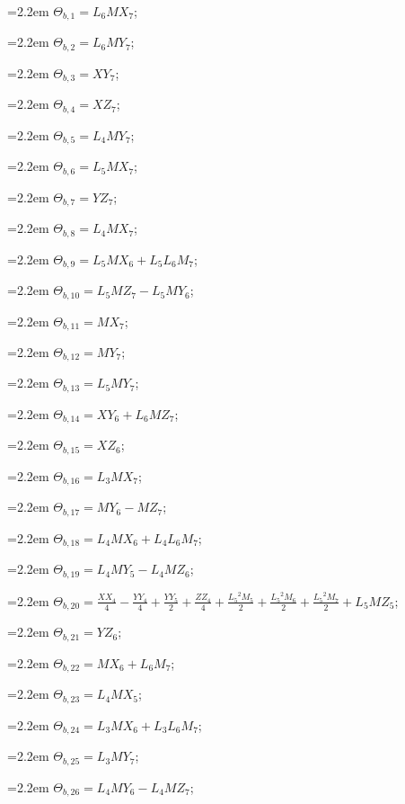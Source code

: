 {\small\setlength{\parindent}{0pt}\raggedright
\hangindent=2.2em $\Theta_{b,1}=L_{6}MX_{7}$;\par
\hangindent=2.2em $\Theta_{b,2}=L_{6}MY_{7}$;\par
\hangindent=2.2em $\Theta_{b,3}=XY_{7}$;\par
\hangindent=2.2em $\Theta_{b,4}=XZ_{7}$;\par
\hangindent=2.2em $\Theta_{b,5}=L_{4}MY_{7}$;\par
\hangindent=2.2em $\Theta_{b,6}=L_{5}MX_{7}$;\par
\hangindent=2.2em $\Theta_{b,7}=YZ_{7}$;\par
\hangindent=2.2em $\Theta_{b,8}=L_{4}MX_{7}$;\par
\hangindent=2.2em $\Theta_{b,9}=L_{5}MX_{6}+L_{5}L_{6}M_{7}$;\par
\hangindent=2.2em $\Theta_{b,10}=L_{5}MZ_{7}-L_{5}MY_{6}$;\par
\hangindent=2.2em $\Theta_{b,11}=MX_{7}$;\par
\hangindent=2.2em $\Theta_{b,12}=MY_{7}$;\par
\hangindent=2.2em $\Theta_{b,13}=L_{5}MY_{7}$;\par
\hangindent=2.2em $\Theta_{b,14}=XY_{6}+L_{6}MZ_{7}$;\par
\hangindent=2.2em $\Theta_{b,15}=XZ_{6}$;\par
\hangindent=2.2em $\Theta_{b,16}=L_{3}MX_{7}$;\par
\hangindent=2.2em $\Theta_{b,17}=MY_{6}-MZ_{7}$;\par
\hangindent=2.2em $\Theta_{b,18}=L_{4}MX_{6}+L_{4}L_{6}M_{7}$;\par
\hangindent=2.2em $\Theta_{b,19}=L_{4}MY_{5}-L_{4}MZ_{6}$;\par
\hangindent=2.2em $\Theta_{b,20}=\tfrac{XX_{4}}{4}-\tfrac{YY_{4}}{4}+\tfrac{YY_{5}}{2}+\tfrac{ZZ_{4}}{4}+\tfrac{{L_{5}}^2M_{5}}{2}+\tfrac{{L_{5}}^2M_{6}}{2}+\tfrac{{L_{5}}^2M_{7}}{2}+L_{5}MZ_{5}$;\par
\hangindent=2.2em $\Theta_{b,21}=YZ_{6}$;\par
\hangindent=2.2em $\Theta_{b,22}=MX_{6}+L_{6}M_{7}$;\par
\hangindent=2.2em $\Theta_{b,23}=L_{4}MX_{5}$;\par
\hangindent=2.2em $\Theta_{b,24}=L_{3}MX_{6}+L_{3}L_{6}M_{7}$;\par
\hangindent=2.2em $\Theta_{b,25}=L_{3}MY_{7}$;\par
\hangindent=2.2em $\Theta_{b,26}=L_{4}MY_{6}-L_{4}MZ_{7}$;\par
}
